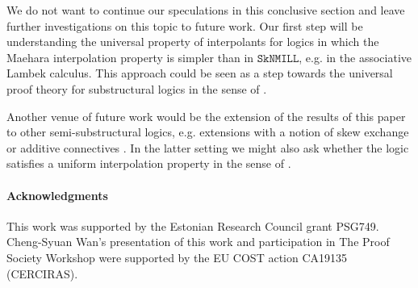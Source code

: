 \documentclass[sn-mathphys-num]{sn-jnl}%
\newcommand{\SkNMILL}{$\mathtt{SkNMILL}$}
\theoremstyle{thmstyleone}%
\theoremstyle{thmstyletwo}%
\theoremstyle{thmstylethree}%
\begin{document}
We do not want to continue our speculations in this conclusive section and leave further investigations on this topic to future work.
Our first step will be understanding the universal property of interpolants for logics in which the Maehara interpolation property is simpler than in \SkNMILL, e.g. in the associative Lambek calculus. 
This approach could be seen as a step towards the universal proof theory for substructural logics in the sense of \cite{Tabatabai2025}.

Another venue of future work would be the  extension of the results of this paper to other semi-substructural logics, e.g. extensions with a notion of skew exchange \cite{veltri:coherence:2024} or additive connectives \cite{VW:2023}.
In the latter setting we might also ask whether the logic satisfies a uniform interpolation property in the sense of \cite{alizadeh:2014}.

\paragraph{Acknowledgments}
This work was supported by the Estonian Research Council grant PSG749.
Cheng-Syuan Wan's presentation of this work and participation in The Proof Society Workshop were supported by the EU COST action CA19135 (CERCIRAS).







\end{document}

